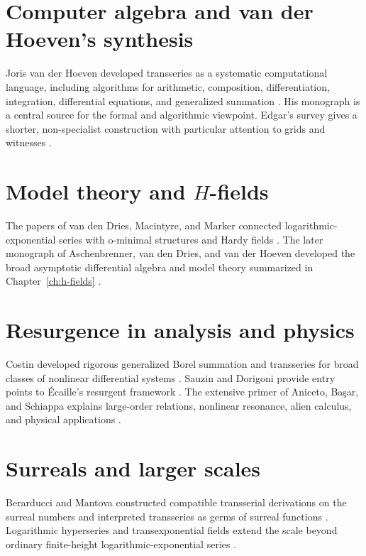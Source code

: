 \documentclass[11pt,oneside]{book}
\theoremstyle{definition}
\theoremstyle{remark}
\begin{document}
\section{Computer algebra and van der Hoeven's synthesis}

Joris van der Hoeven developed transseries as a systematic computational
language, including algorithms for arithmetic, composition, differentiation,
integration, differential equations, and generalized summation
\cite{vanDerHoevenBook,vanDerHoevenOperators}. His monograph is a central source
for the formal and algorithmic viewpoint. Edgar's survey gives a shorter,
non-specialist construction with particular attention to grids and witnesses
\cite{EdgarBeginners}.

\section{Model theory and \texorpdfstring{$H$}{H}-fields}

The papers of van den Dries, Macintyre, and Marker connected logarithmic-
exponential series with o-minimal structures and Hardy fields
\cite{vanDenDriesMacintyreMarker1997,vanDenDriesMacintyreMarker2001}. The later
monograph of Aschenbrenner, van den Dries, and van der Hoeven developed the broad
asymptotic differential algebra and model theory summarized in
Chapter~\ref{ch:h-fields} \cite{ADHBook}.

\section{Resurgence in analysis and physics}

Costin developed rigorous generalized Borel summation and transseries for broad
classes of nonlinear differential systems
\cite{CostinTopological,CostinBook,CostinRankOne}. Sauzin and Dorigoni provide
entry points to \'Ecaille's resurgent framework
\cite{SauzinIntro,DorigoniIntro}. The extensive primer of Aniceto, Ba\c{s}ar,
and Schiappa explains large-order relations, nonlinear resonance, alien calculus,
and physical applications \cite{AnicetoBasarSchiappa}.

\section{Surreals and larger scales}

Berarducci and Mantova constructed compatible transserial derivations on the
surreal numbers and interpreted transseries as germs of surreal functions
\cite{BerarducciMantovaSurreal,BerarducciMantovaGerms}. Logarithmic hyperseries
and transexponential fields extend the scale beyond ordinary finite-height
logarithmic-exponential series
\cite{vanDenDriesHoevenKaplan,PadgettTransexponential}.
\end{document}
